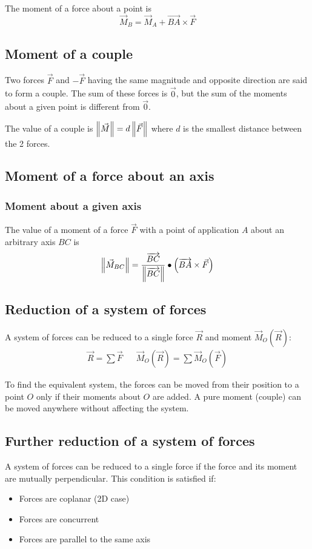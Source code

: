\documentclass[10pt, twocolumn]{article}
\begin{document}
The moment of a force about a point is
\[
  \vec{M}_B = \vec{M}_A + \Vec{BA} \times \vec{F}
\]
\subsection{Moment of a couple}
Two forces \(\vec{F}\) and \(- \vec{F}\) having the same magnitude and opposite direction are said to form a couple.
The sum of these forces is \(\vec{0}\), but the sum of the moments about a given point is different from \(\vec{0}\).

The value of a couple is \(\left\| \vec{M} \right\| = d\left\| \vec{F} \right\|\) where \(d\) is the smallest distance between the 2 forces.

\subsection{Moment of a force about an axis}
\subsubsection{Moment about a given axis}
The value of a moment of a force \(\vec{F}\) with a point of application \(A\) about an arbitrary axis \(BC\) is
\[
  \left\| \vec{M}_{BC} \right\| = \frac{\overrightarrow{BC}}{\left\| \overrightarrow{BC} \right\|} \bullet \left( \overrightarrow{BA} \times \vec{F} \right)
\]

\subsection{Reduction of a system of forces}
A system of forces can be reduced to a single force \(\vec{R}\) and moment \(\vec{M}_O(\vec{R})\):
\begin{align*}
  \vec{R} = \sum{\vec{F}} &  & \vec{M}_O(\vec{R}) = \sum{\vec{M}_O(\vec{F})}
\end{align*}

To find the equivalent system, the forces can be moved from their position to a point \(O\) only if their moments about \(O\) are added.
A pure moment (couple) can be moved anywhere without affecting the system.

\subsection{Further reduction of a system of forces}
A system of forces can be reduced to a single force if the force and its moment are mutually perpendicular.
This condition is satisfied if:
\begin{itemize}
  \item Forces are coplanar (2D case)
  \item Forces are concurrent
  \item Forces are parallel to the same axis
\end{itemize}
\end{document}
